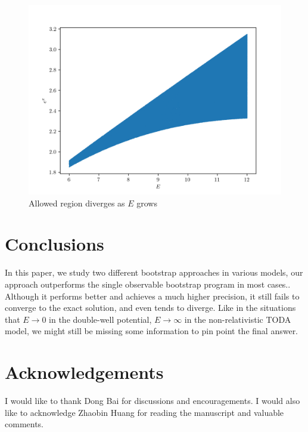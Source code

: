 \documentclass[aps, preprint,amsmath, amssymb]{revtex4-2}
\begin{document}
\begin{figure}
	\includegraphics[width=0.8\linewidth]{todal.png}
	\caption{Allowed region diverges as $E$ grows}
	\label{fig:todal}
\end{figure}

\section{Conclusions}
In this paper, we study two different bootstrap approaches in various models, our approach outperforms the single observable bootstrap program in most cases..
Although it performs better and achieves a much higher precision, it still fails to converge to the exact solution, and even tends to diverge. Like in the situations that $E \to 0$ in the double-well potential, $E \to \infty$ in the non-relativistic TODA model, we might still be missing some information to pin point the final answer.

\section*{Acknowledgements}
I would like to thank Dong Bai for discussions and encouragements. I would also like to acknowledge Zhaobin Huang for reading the manuscript and valuable comments.


\end{document}
